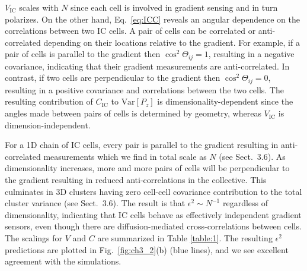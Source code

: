 $V_\text{IC}$ scales with $N$ since each cell is involved in gradient sensing and in turn polarizes. On the other hand, Eq.\ \ref{eq:ICC}
reveals an angular dependence on the correlations between two IC cells. A pair of cells can be correlated or anti-correlated depending on their locations relative to the gradient. For example, if a pair of cells is parallel to the gradient then
$\cos^2\Theta_{ij} = 1$,
resulting in a negative covariance, indicating that their gradient measurements are anti-correlated. In contrast, if two cells are perpendicular to the gradient then
$\cos^2\Theta_{ij} = 0$,
resulting in a positive covariance and correlations between the two cells. The resulting contribution of $C_\text{IC}$ to $\text{Var}[P_z]$ is dimensionality-dependent since the angles made between pairs of cells is determined by geometry, whereas $V_\text{IC}$ is dimension-independent.

For a 1D chain of IC cells, every pair is parallel to the gradient resulting in anti-correlated measurements which we find in total scale as $N$ (see Sect.\ 3.6). As dimensionality increases, more and more pairs of cells will be perpendicular to the gradient resulting in reduced anti-correlations in the collective. This culminates in 3D clusters having zero cell-cell covariance contribution to the total cluster variance (see Sect.\ 3.6). The result is that $\epsilon^2 \sim N^{-1}$ regardless of dimensionality, indicating that IC cells behave as effectively independent gradient sensors, even though there are diffusion-mediated cross-correlations between cells. The scalings for $V$ and $C$ are summarized in Table \ref{table:1}. The resulting $\epsilon^2$ predictions are plotted in Fig.\ \ref{fig:ch3_2}(b) (blue lines), and we see excellent agreement with the simulations.


